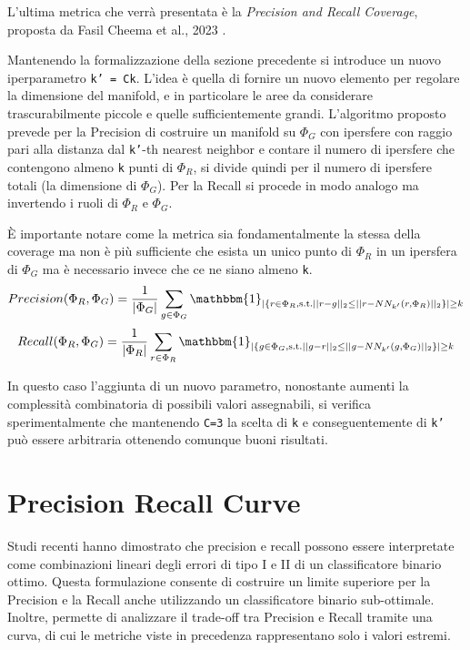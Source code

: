 L'ultima metrica che verrà presentata è la \textit{Precision and Recall Coverage}, proposta da Fasil Cheema et al., 2023 \cite{1PrecisionRecallCover}.

Mantenendo la formalizzazione della sezione precedente si introduce un nuovo iperparametro \texttt{k' = Ck}. L'idea è quella di fornire un nuovo elemento per regolare la dimensione del manifold, e in particolare
le aree da considerare trascurabilmente piccole e quelle sufficientemente grandi. L'algoritmo proposto prevede per la Precision di costruire un manifold su \(\Phi_G\) con ipersfere con raggio pari alla distanza dal \texttt{k'}-th nearest neighbor
e contare il numero di ipersfere che contengono almeno \texttt{k} punti di \(\Phi_R\), si divide quindi per il numero di ipersfere totali (la dimensione di \(\Phi_G\)). 
Per la Recall si procede in modo analogo ma invertendo i ruoli di \(\Phi_R\) e \(\Phi_G\).

È importante notare come la metrica sia fondamentalmente la stessa della coverage ma non è più sufficiente che esista un unico punto di \(\Phi_R\) in un ipersfera di \(\Phi_G\) ma è necessario invece che ce ne siano almeno \texttt{k}.
\begin{equation}
    Precision(\Phi_R, \Phi_G) = \frac{1}{|\Phi_G|} \sum_{g \in \Phi_G} \mathbbm{1}_{|\{ r \in \Phi_R, \text{s.t.} ||r - g||_2 \leq ||r - NN_{k'}(r, \Phi_R)||_2 \}| \geq k}
\end{equation}
\begin{equation}
    Recall(\Phi_R, \Phi_G) = \frac{1}{|\Phi_R|} \sum_{r \in \Phi_R} \mathbbm{1}_{|\{ g \in \Phi_G, \text{s.t.} ||g - r||_2 \leq ||g - NN_{k'}(g, \Phi_G)||_2 \}| \geq k}
\end{equation}

In questo caso l'aggiunta di un nuovo parametro, nonostante aumenti la complessità combinatoria di possibili valori assegnabili, si verifica sperimentalmente che mantenendo \texttt{C=3} la scelta di \texttt{k} e conseguentemente di \texttt{k'} può essere arbitraria
ottenendo comunque buoni risultati.

\section{Precision Recall Curve}  
\label{sec:precision-recall-curve}

Studi recenti \cite{5RevisitingPrecisionRecall, 6UnifyingPrecisionRecall, 7AssessingWithPrecisionRecall} hanno dimostrato che precision e recall possono essere interpretate come combinazioni lineari degli errori di tipo I e II di un classificatore binario ottimo.
Questa formulazione consente di costruire un limite superiore per la Precision e la Recall anche utilizzando un classificatore binario sub-ottimale. 
Inoltre, permette di analizzare il trade-off tra Precision e Recall tramite una curva, di cui le metriche viste in precedenza rappresentano solo i valori estremi.


